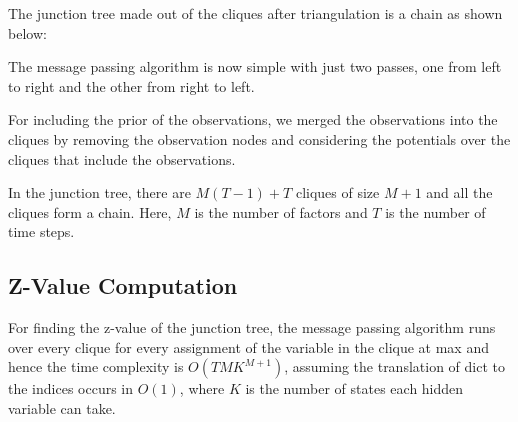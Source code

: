 The junction tree made out of the cliques after triangulation is a chain as shown below:

\begin{center}
\end{center}

The message passing algorithm is now simple with just two passes, one from left to right and the other from right to left.

For including the prior of the observations, we merged the observations into the cliques by removing the observation nodes and considering the potentials over the cliques that include the observations.

In the junction tree, there are $M(T-1) + T$ cliques of size $M+1$ and all the cliques form a chain. Here, $M$ is the number of factors and $T$ is the number of time steps.

\subsection{Z-Value Computation}
For finding the z-value of the junction tree, the message passing algorithm runs over every clique for every assignment of the variable in the clique at max and hence the time complexity is $O(TMK^{M+1})$, assuming the translation of dict to the indices occurs in $O(1)$, where $K$ is the number of states each hidden variable can take.


